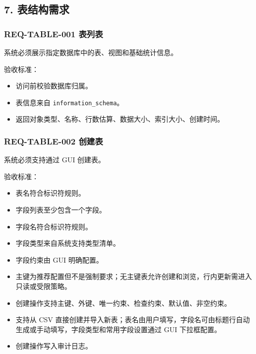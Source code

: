 \documentclass[
  a4paper,
  UTF8]{ctexart}
\providecommand{\tightlist}{%
  \setlength{\itemsep}{0pt}\setlength{\parskip}{0pt}}
\begin{document}
\hypertarget{ux8868ux7ed3ux6784ux9700ux6c42}{%
\subsection{7. 表结构需求}\label{ux8868ux7ed3ux6784ux9700ux6c42}}

\hypertarget{req-table-001-ux8868ux5217ux8868}{%
\subsubsection{REQ-TABLE-001
表列表}\label{req-table-001-ux8868ux5217ux8868}}

系统必须展示指定数据库中的表、视图和基础统计信息。

验收标准：

\begin{itemize}
\tightlist
\item
  访问前校验数据库归属。
\item
  表信息来自 \texttt{information\_schema}。
\item
  返回对象类型、名称、行数估算、数据大小、索引大小、创建时间。
\end{itemize}

\hypertarget{req-table-002-ux521bux5efaux8868}{%
\subsubsection{REQ-TABLE-002
创建表}\label{req-table-002-ux521bux5efaux8868}}

系统必须支持通过 GUI 创建表。

验收标准：

\begin{itemize}
\tightlist
\item
  表名符合标识符规则。
\item
  字段列表至少包含一个字段。
\item
  字段名符合标识符规则。
\item
  字段类型来自系统支持类型清单。
\item
  字段约束由 GUI 明确配置。
\item
  主键为推荐配置但不是强制要求；无主键表允许创建和浏览，行内更新需进入只读或受限策略。
\item
  创建操作支持主键、外键、唯一约束、检查约束、默认值、非空约束。
\item
  支持从 CSV
  直接创建并导入新表；表名由用户填写，字段名可由标题行自动生成或手动填写，字段类型和常用字段设置通过
  GUI 下拉框配置。
\item
  创建操作写入审计日志。
\end{itemize}
\end{document}
